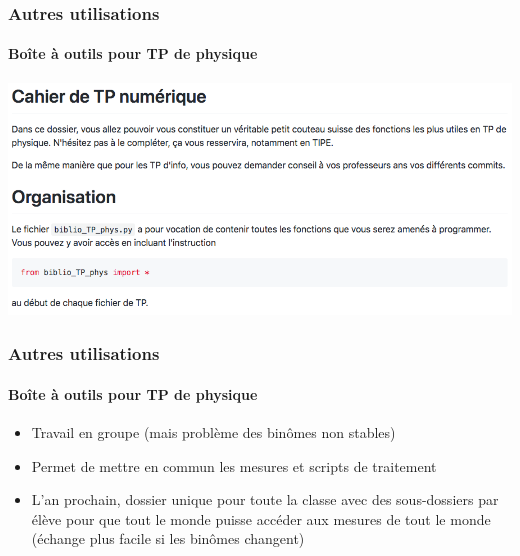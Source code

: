 
\begin{frame}
	\frametitle{Autres utilisations}
	\framesubtitle{Boîte à outils pour TP de physique}

	\begin{center}
		\includegraphics[width=\linewidth]{figures/cahier_de_TP.png}
	\end{center}
\end{frame}

\begin{frame}
	\frametitle{Autres utilisations}
	\framesubtitle{Boîte à outils pour TP de physique}


	\begin{itemize}[<+->]
		\item Travail en groupe (mais problème des binômes non stables)

		\item Permet de mettre en commun les mesures et scripts de traitement

		\item L'an prochain, dossier unique pour toute la classe avec des sous-dossiers par élève pour que tout le monde puisse accéder aux mesures de tout le monde (échange plus facile si les binômes changent)
	\end{itemize}
\end{frame}
